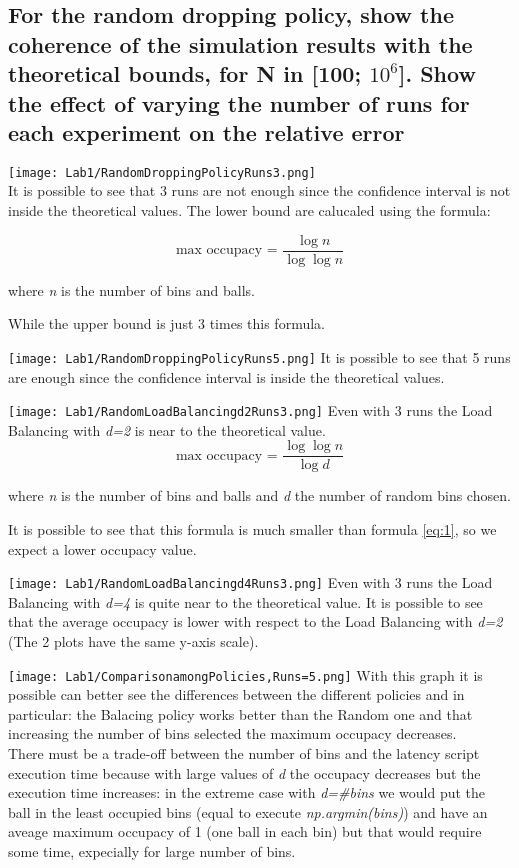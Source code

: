 \documentclass{report}
\begin{document}
{			\subsection{For the random dropping policy, show the coherence of the simulation results with the theoretical bounds, for N in [100; $10^6$]. Show the effect of varying the number of runs for each experiment on the relative error}
			
			\texttt{[image: Lab1/RandomDroppingPolicyRuns3.png]} \\
			It is possible to see that 3 runs are not enough since the confidence interval is not inside the theoretical values.
			The lower bound are calucaled using the formula:
			
			\begin{equation} \label{eq:1}
				 \text{max occupacy = }\frac{\log n}{\log \log n} 
			\end{equation}
			\begin{center}
					where \emph{n} is the number of bins and balls.
			\end{center}
			While the upper bound is just 3 times this formula.
			
			\texttt{[image: Lab1/RandomDroppingPolicyRuns5.png]}
			It is possible to see that 5 runs are enough since the confidence interval is inside the theoretical values.
			
			\texttt{[image: Lab1/RandomLoadBalancingd2Runs3.png]}
			Even with 3 runs the Load Balancing with \emph{d=2} is near to the theoretical value.
			\begin{equation} \label{eq:2}
				 \text{max occupacy = }\frac{\log \log n}{\log d}
			\end{equation}
			\begin{center}
					where \emph{n} is the number of bins and balls and \emph{d} the number of random bins chosen.
			\end{center}
			It is possible to see that this formula is much smaller than formula \ref{eq:1}, so we expect a lower occupacy value.
			
			\texttt{[image: Lab1/RandomLoadBalancingd4Runs3.png]}
			Even with 3 runs the Load Balancing with \emph{d=4} is quite near to the theoretical value. 
			It is possible to see that the average occupacy is lower with respect to the Load Balancing with \emph{d=2} (The 2 plots have the same y-axis scale).
			
			\texttt{[image: Lab1/ComparisonamongPolicies,Runs=5.png]}
			With this graph it is possible can better see the differences between the different policies and in particular: the Balacing policy works better than the Random one and that increasing the number of bins selected the maximum occupacy decreases. \\ There must be a trade-off between the number of bins and the latency script execution time because with large values of \emph{d} the occupacy decreases but the execution time increases: in the extreme case with \emph{d=\#bins} we would put the ball in the least occupied bins (equal to execute \emph{np.argmin(bins)}) and have an aveage maximum occupacy of 1 (one ball in each bin)  but that would require some time, expecially for large number of bins.
			
}
\end{document}
